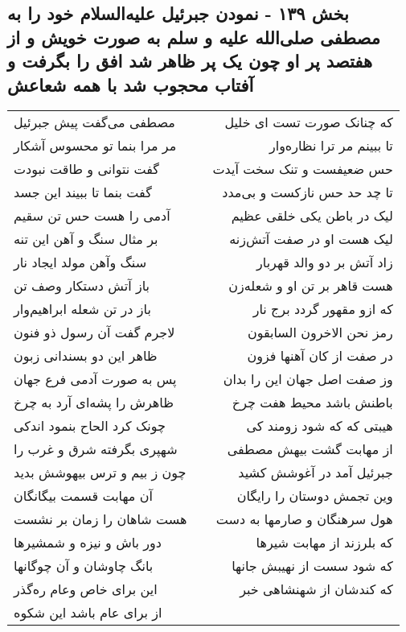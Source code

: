\begin{center}
\section*{بخش ۱۳۹ - نمودن جبرئیل علیه‌السلام خود را به مصطفی صلی‌الله علیه و  سلم به صورت خویش و از هفتصد پر او چون یک پر ظاهر شد افق را  بگرفت و آفتاب محجوب شد با همه شعاعش}
\label{sec:sh139}
\begin{longtable}{l p{0.5cm} r}
مصطفی می‌گفت پیش جبرئیل
&&
که چنانک صورت تست ای خلیل
\\
مر مرا بنما تو محسوس آشکار
&&
تا ببینم مر ترا نظاره‌وار
\\
گفت نتوانی و طاقت نبودت
&&
حس ضعیفست و تنک سخت آیدت
\\
گفت بنما تا ببیند این جسد
&&
تا چد حد حس نازکست و بی‌مدد
\\
آدمی را هست حس تن سقیم
&&
لیک در باطن یکی خلقی عظیم
\\
بر مثال سنگ و آهن این تنه
&&
لیک هست او در صفت آتش‌زنه
\\
سنگ وآهن مولد ایجاد نار
&&
زاد آتش بر دو والد قهربار
\\
باز آتش دستکار وصف تن
&&
هست قاهر بر تن او و شعله‌زن
\\
باز در تن شعله ابراهیم‌وار
&&
که ازو مقهور گردد برج نار
\\
لاجرم گفت آن رسول ذو فنون
&&
رمز نحن الاخرون السابقون
\\
ظاهر این دو بسندانی زبون
&&
در صفت از کان آهنها فزون
\\
پس به صورت آدمی فرع جهان
&&
وز صفت اصل جهان این را بدان
\\
ظاهرش را پشه‌ای آرد به چرخ
&&
باطنش باشد محیط هفت چرخ
\\
چونک کرد الحاح بنمود اندکی
&&
هیبتی که که شود زومند کی
\\
شهپری بگرفته شرق و غرب را
&&
از مهابت گشت بیهش مصطفی
\\
چون ز بیم و ترس بیهوشش بدید
&&
جبرئیل آمد در آغوشش کشید
\\
آن مهابت قسمت بیگانگان
&&
وین تجمش دوستان را رایگان
\\
هست شاهان را زمان بر نشست
&&
هول سرهنگان و صارمها به دست
\\
دور باش و نیزه و شمشیرها
&&
که بلرزند از مهابت شیرها
\\
بانگ چاوشان و آن چوگانها
&&
که شود سست از نهیبش جانها
\\
این برای خاص وعام ره‌گذر
&&
که کندشان از شهنشاهی خبر
\\
از برای عام باشد این شکوه
&&

\end{longtable}
\end{center}
